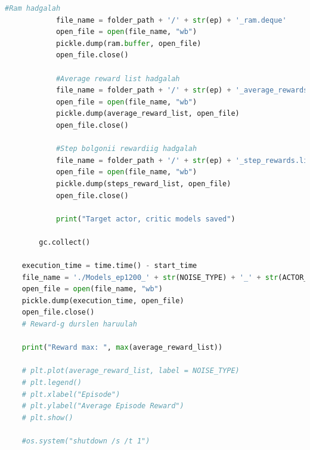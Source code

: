 \documentclass[12pt,A4]{report}
\begin{document}
\begin{lstlisting}[language=Python, caption=main.py, frame=single]
            #Ram hadgalah
            file_name = folder_path + '/' + str(ep) + '_ram.deque'
            open_file = open(file_name, "wb")
            pickle.dump(ram.buffer, open_file)
            open_file.close()

            #Average reward list hadgalah
            file_name = folder_path + '/' + str(ep) + '_average_rewards.list'
            open_file = open(file_name, "wb")
            pickle.dump(average_reward_list, open_file)
            open_file.close()

            #Step bolgonii rewardiig hadgalah
            file_name = folder_path + '/' + str(ep) + '_step_rewards.list'
            open_file = open(file_name, "wb")
            pickle.dump(steps_reward_list, open_file)
            open_file.close()

            print("Target actor, critic models saved")
        
        gc.collect()
    
    execution_time = time.time() - start_time
    file_name = './Models_ep1200_' + str(NOISE_TYPE) + '_' + str(ACTOR_LEARNING_RATE) + '_' + str(CRITIC_LEARNING_RATE) + '/' + str(ep) + '_execution_time.sec'
    open_file = open(file_name, "wb")
    pickle.dump(execution_time, open_file)
    open_file.close()
    # Reward-g durslen haruulah

    print("Reward max: ", max(average_reward_list))

    # plt.plot(average_reward_list, label = NOISE_TYPE)
    # plt.legend()
    # plt.xlabel("Episode")
    # plt.ylabel("Average Episode Reward")
    # plt.show()

    #os.system("shutdown /s /t 1")

\end{lstlisting}
\end{document}
